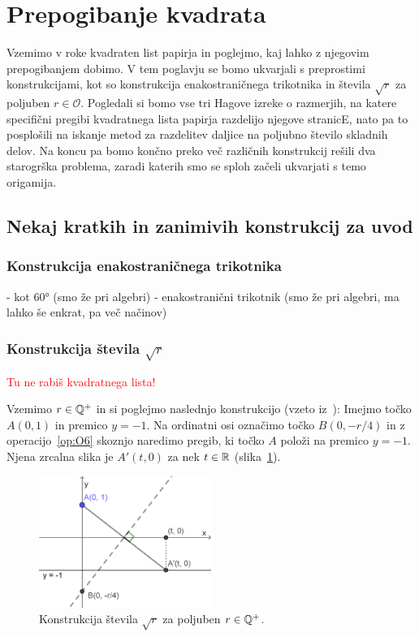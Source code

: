 \section{Prepogibanje kvadrata}
\label{pogl:prepog_kvadrata}

Vzemimo v roke kvadraten list papirja in poglejmo, kaj lahko z njegovim prepogibanjem dobimo. V tem poglavju se bomo ukvarjali s preprostimi konstrukcijami, kot so konstrukcija enakostraničnega trikotnika in števila $\sqrt{r}$ za poljuben $r \in \mathcal{O}$. Pogledali si bomo vse tri Hagove izreke o razmerjih, na katere specifični pregibi kvadratnega lista papirja razdelijo njegove stranicE, nato pa to posplošili na iskanje metod za razdelitev daljice na poljubno število skladnih delov. Na koncu pa bomo končno preko več različnih konstrukcij rešili dva starogrška problema, zaradi katerih smo se sploh začeli ukvarjati s temo origamija.

\subsection{Nekaj kratkih in zanimivih konstrukcij za uvod}

\subsubsection*{Konstrukcija enakostraničnega trikotnika}

- kot 60° (smo že pri algebri)
- enakostranični trikotnik (smo že pri algebri, ma lahko še enkrat, pa več načinov)

\subsubsection*{Konstrukcija števila $\sqrt{r}$}

\textcolor{red}{Tu ne rabiš kvadratnega lista!}

Vzemimo $r \in \mathbb Q^+$ in si poglejmo naslednjo konstrukcijo (vzeto iz~\cite[str.\ 58]{hull2013}):
Imejmo točko $A (0, 1) $ in premico $y = -1$. Na ordinatni osi označimo točko $B (0, -r/4)$ in z operacijo~\ref{op:O6} skoznjo naredimo pregib, ki točko $A$ položi na premico $y = -1$. Njena zrcalna slika je $A' (t, 0) $ za nek $t \in \mathbb R$ (slika~\ref{fig:konstrukcija_korena}).

\begin{figure}[h]
    \centering
    \includegraphics[width=0.5\textwidth]{images/kvadratni_koren.png}
    \caption[Konstrukcija korena]{Konstrukcija števila $\sqrt{r}$ za poljuben $r \in \mathbb Q^{+}$.}
    \label{fig:konstrukcija_korena}
\end{figure}

